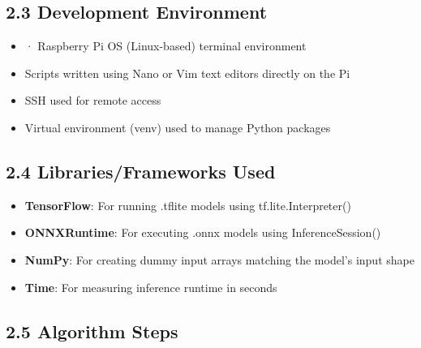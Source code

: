 \documentclass[12pt]{article}
\begin{document}
\subsection*{2.3 Development Environment}
\begin{itemize}
\item  · Raspberry Pi OS (Linux-based) terminal environment
\item Scripts written using Nano or Vim text editors directly on the Pi
\item SSH used for remote access
\item Virtual environment (venv) used to manage Python packages

\end{itemize}

\subsection*{2.4 Libraries/Frameworks Used}
\begin{itemize}
\item \textbf{TensorFlow}: For running .tflite models using tf.lite.Interpreter()

\item \textbf{ONNXRuntime}: For executing .onnx models using InferenceSession()

\item \textbf{NumPy}: For creating dummy input arrays matching the model’s input shape

\item \textbf{Time}: For measuring inference runtime in seconds

\end{itemize}

\subsection*{2.5 Algorithm Steps}
\end{document}
